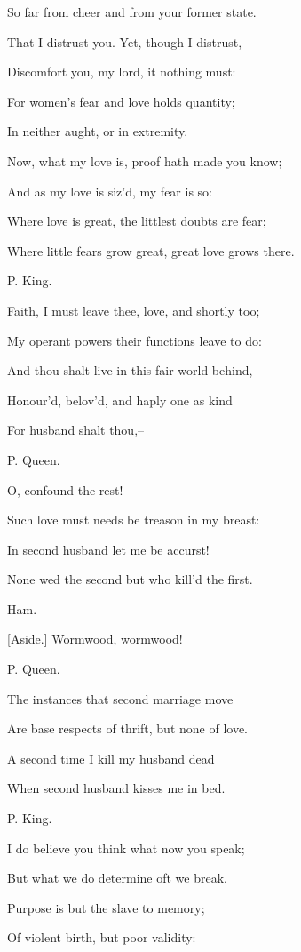 \documentclass[12pt]{book}
\begin{document}
So far from cheer and from your former state.

That I distrust you. Yet, though I distrust,

Discomfort you, my lord, it nothing must:

For women's fear and love holds quantity;

In neither aught, or in extremity.

Now, what my love is, proof hath made you know;

And as my love is siz'd, my fear is so:

Where love is great, the littlest doubts are fear;

Where little fears grow great, great love grows there.



P. King.

Faith, I must leave thee, love, and shortly too;

My operant powers their functions leave to do:

And thou shalt live in this fair world behind,

Honour'd, belov'd, and haply one as kind

For husband shalt thou,--



P. Queen.

O, confound the rest!

Such love must needs be treason in my breast:

In second husband let me be accurst!

None wed the second but who kill'd the first.



Ham.

[Aside.] Wormwood, wormwood!



P. Queen.

The instances that second marriage move

Are base respects of thrift, but none of love.

A second time I kill my husband dead

When second husband kisses me in bed.



P. King.

I do believe you think what now you speak;

But what we do determine oft we break.

Purpose is but the slave to memory;

Of violent birth, but poor validity:
\end{document}

